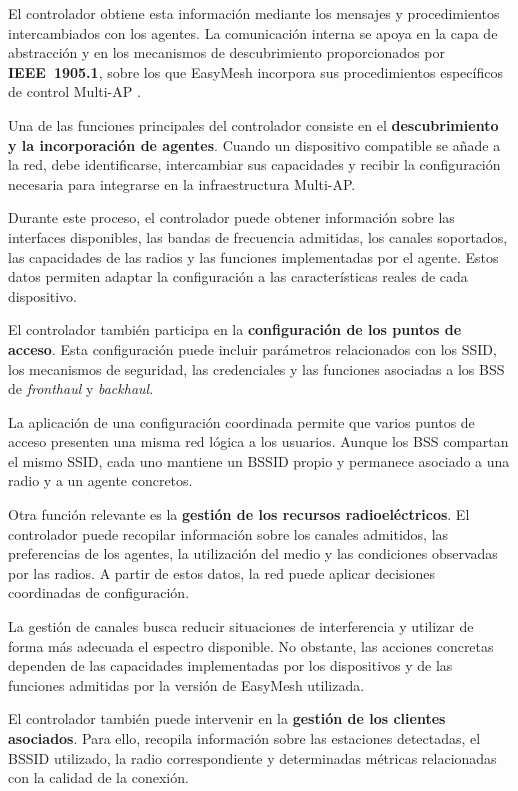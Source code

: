 El controlador obtiene esta información mediante los mensajes y
procedimientos intercambiados con los agentes. La comunicación interna se
apoya en la capa de abstracción y en los mecanismos de descubrimiento
proporcionados por \textbf{IEEE~1905.1}, sobre los que EasyMesh incorpora
sus procedimientos específicos de control Multi-AP
\cite{ieee_1905_1,wifi_alliance_easymesh}.

Una de las funciones principales del controlador consiste en el
\textbf{descubrimiento y la incorporación de agentes}. Cuando un
dispositivo compatible se añade a la red, debe identificarse,
intercambiar sus capacidades y recibir la configuración necesaria para
integrarse en la infraestructura Multi-AP.

Durante este proceso, el controlador puede obtener información sobre las
interfaces disponibles, las bandas de frecuencia admitidas, los canales
soportados, las capacidades de las radios y las funciones implementadas
por el agente. Estos datos permiten adaptar la configuración a las
características reales de cada dispositivo.

El controlador también participa en la
\textbf{configuración de los puntos de acceso}. Esta configuración puede
incluir parámetros relacionados con los SSID, los mecanismos de
seguridad, las credenciales y las funciones asociadas a los BSS de
\textit{fronthaul} y \textit{backhaul}.

La aplicación de una configuración coordinada permite que varios puntos
de acceso presenten una misma red lógica a los usuarios. Aunque los BSS
compartan el mismo SSID, cada uno mantiene un BSSID propio y permanece
asociado a una radio y a un agente concretos.

Otra función relevante es la
\textbf{gestión de los recursos radioeléctricos}. El controlador puede
recopilar información sobre los canales admitidos, las preferencias de
los agentes, la utilización del medio y las condiciones observadas por
las radios. A partir de estos datos, la red puede aplicar decisiones
coordinadas de configuración.

La gestión de canales busca reducir situaciones de interferencia y
utilizar de forma más adecuada el espectro disponible. No obstante, las
acciones concretas dependen de las capacidades implementadas por los
dispositivos y de las funciones admitidas por la versión de EasyMesh
utilizada.

El controlador también puede intervenir en la
\textbf{gestión de los clientes asociados}. Para ello, recopila
información sobre las estaciones detectadas, el BSSID utilizado, la radio
correspondiente y determinadas métricas relacionadas con la calidad de
la conexión.

